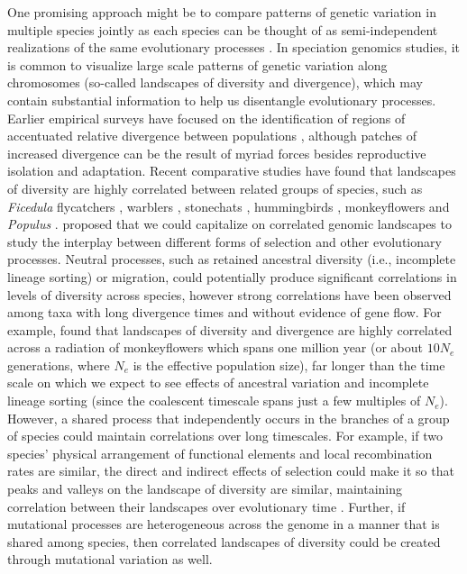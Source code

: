 One promising approach might be to compare patterns of genetic variation in multiple species jointly
as each species can be thought of as semi-independent realizations of the same evolutionary processes \citep[c.f.][]{won_divergence_2005}.
In speciation genomics studies, it is common to visualize large scale patterns of genetic variation along chromosomes (so-called landscapes of diversity and divergence),
which may contain substantial information to help us disentangle evolutionary processes.
Earlier empirical surveys have focused on the identification of regions of 
accentuated relative divergence between populations \parencite{cruickshank_reanalysis_2014, harr_genomic_2006, turner_genomic_2005},
although patches of increased divergence can be the result of myriad forces besides reproductive isolation and adaptation.
Recent comparative studies have found that landscapes of diversity are highly correlated between related groups of species,
such as \textit{Ficedula} flycatchers \citep{burri_linked_2015, ellegren_genomic_2012}, warblers \citep{irwin_recurrent_2016}, stonechats \citep{van_doren_correlated_2017}, hummingbirds \citep{battey_evidence_2020}, monkeyflowers \citep{stankowski_widespread_2019}  and \textit{Populus} \citep{wang_evidence_2020}.
\citet{burri_interpreting_2017} proposed that we could capitalize on correlated genomic landscapes to study the interplay between different forms of selection and other evolutionary processes.
Neutral processes, such as retained ancestral diversity (i.e., incomplete lineage sorting) or migration, could potentially produce significant correlations in levels of diversity across species,
however strong correlations have been observed among taxa with long divergence times and without evidence of gene flow. 
For example, \citet{stankowski_widespread_2019} found that landscapes of diversity and divergence are highly correlated across a radiation of monkeyflowers which spans one million year (or about $10N_e$ generations, where $N_e$ is the effective population size),
far longer than the time scale on which we expect to see effects of ancestral variation and incomplete lineage sorting (since the coalescent timescale spans just a few multiples of $N_e$).
However, a shared process that independently occurs in the branches of a group of species could maintain correlations over long timescales.
For example, if two species' physical arrangement of functional elements and local recombination rates are similar,
the direct and indirect effects of selection could make it so that peaks and valleys on the landscape of diversity are similar,
maintaining correlation between their landscapes over evolutionary time \parencite{burri_interpreting_2017, delmore_comparative_2018}.
Further, if mutational processes are heterogeneous across the genome in a manner that is shared among species,
then correlated landscapes of diversity could be created through mutational variation as well. 

